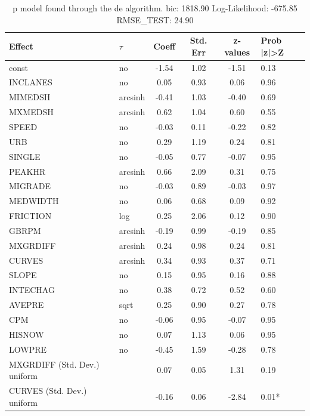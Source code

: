 \begin{table}
	\caption{p model found through the de algorithm. bic: 1818.90 Log-Likelihood: -675.85 RMSE_TEST: 24.90}
	\begin{center}
		\begin{tabular}{|l|l|c|c|c|l|}
			\hline
			Effect & $\tau$ & Coeff & Std. Err & z-values & Prob |z|>Z \\
			\hline
			const & no & -1.54 & 1.02 & -1.51 & 0.13 \\
			\hline
			INCLANES & no & 0.05 & 0.93 & 0.06 & 0.96 \\
			\hline
			MIMEDSH & arcsinh & -0.41 & 1.03 & -0.40 & 0.69 \\
			\hline
			MXMEDSH & arcsinh & 0.62 & 1.04 & 0.60 & 0.55 \\
			\hline
			SPEED & no & -0.03 & 0.11 & -0.22 & 0.82 \\
			\hline
			URB & no & 0.29 & 1.19 & 0.24 & 0.81 \\
			\hline
			SINGLE & no & -0.05 & 0.77 & -0.07 & 0.95 \\
			\hline
			PEAKHR & arcsinh & 0.66 & 2.09 & 0.31 & 0.75 \\
			\hline
			MIGRADE & no & -0.03 & 0.89 & -0.03 & 0.97 \\
			\hline
			MEDWIDTH & no & 0.06 & 0.68 & 0.09 & 0.92 \\
			\hline
			FRICTION & log & 0.25 & 2.06 & 0.12 & 0.90 \\
			\hline
			GBRPM & arcsinh & -0.19 & 0.99 & -0.19 & 0.85 \\
			\hline
			MXGRDIFF & arcsinh & 0.24 & 0.98 & 0.24 & 0.81 \\
			\hline
			CURVES & arcsinh & 0.34 & 0.93 & 0.37 & 0.71 \\
			\hline
			SLOPE & no & 0.15 & 0.95 & 0.16 & 0.88 \\
			\hline
			INTECHAG & no & 0.38 & 0.72 & 0.52 & 0.60 \\
			\hline
			AVEPRE & sqrt & 0.25 & 0.90 & 0.27 & 0.78 \\
			\hline
			CPM & no & -0.06 & 0.95 & -0.07 & 0.95 \\
			\hline
			HISNOW & no & 0.07 & 1.13 & 0.06 & 0.95 \\
			\hline
			LOWPRE & no & -0.45 & 1.59 & -0.28 & 0.78 \\
			\hline
			MXGRDIFF (Std. Dev.) uniform &  & 0.07 & 0.05 & 1.31 & 0.19 \\
			\hline
			CURVES (Std. Dev.) uniform &  & -0.16 & 0.06 & -2.84 & 0.01* \\

\end{tabular}
\end{center}
\end{table}
